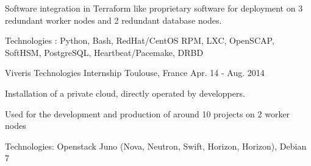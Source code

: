 \begin{cventries}
{\begin{cvitems}
    \item {Software integration in Terraform like proprietary software for deployment on 3 redundant worker nodes and 2 redundant database nodes.}
    \item {Technologies : Python, Bash, RedHat/CentOS RPM, LXC, OpenSCAP, SoftHSM, PostgreSQL, Heartbeat/Pacemake, DRBD}
  \end{cvitems}
  }
  \cventry
  {Viveris Technologies}
  {Internship}
  {Toulouse, France}
  {Apr. 14 - Aug. 2014}
  {
  \begin{cvitems}
    \item {Installation of a private cloud, directly operated by developpers.}
    \item {Used for the development and production of around 10 projects on 2 worker nodes}
    \item {Technologies: Openstack Juno (Nova, Neutron, Swift, Horizon, Horizon), Debian 7}
  \end{cvitems}
  }
\end{cventries}
